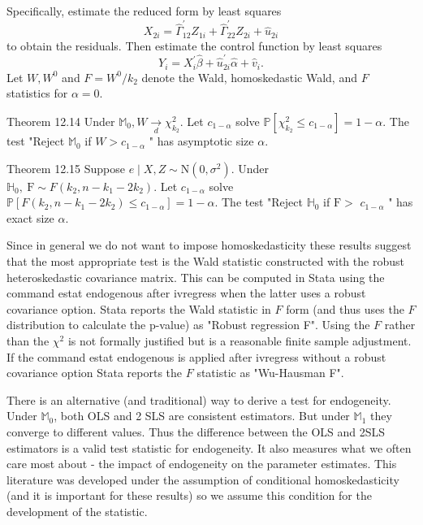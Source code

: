 \documentclass[10pt]{article}
\begin{document}
Specifically, estimate the reduced form by least squares
$$
X_{2 i}=\widehat{\Gamma}_{12}^{\prime} Z_{1 i}+\widehat{\Gamma}_{22}^{\prime} Z_{2 i}+\widehat{u}_{2 i}
$$
to obtain the residuals. Then estimate the control function by least squares
$$
Y_{i}=X_{i}^{\prime} \widehat{\beta}+\widehat{u}_{2 i}^{\prime} \widehat{\alpha}+\widehat{v}_{i} .
$$
Let $W, W^{0}$ and $F=W^{0} / k_{2}$ denote the Wald, homoskedastic Wald, and $F$ statistics for $\alpha=0$.

Theorem 12.14 Under $\mathbb{M}_{0}, W \underset{d}{\longrightarrow} \chi_{k_{2}}^{2}$. Let $c_{1-\alpha}$ solve $\mathbb{P}\left[\chi_{k_{2}}^{2} \leq c_{1-\alpha}\right]=1-\alpha$. The test "Reject $\mathbb{M}_{0}$ if $W>c_{1-\alpha}$ " has asymptotic size $\alpha$.

Theorem 12.15 Suppose $e \mid X, Z \sim \mathrm{N}\left(0, \sigma^{2}\right)$. Under $\mathbb{H}_{0}, \mathrm{~F} \sim F\left(k_{2}, n-k_{1}-2 k_{2}\right)$. Let $c_{1-\alpha}$ solve $\mathbb{P}\left[F\left(k_{2}, n-k_{1}-2 k_{2}\right) \leq c_{1-\alpha}\right]=1-\alpha$. The test "Reject $\mathbb{H}_{0}$ if $\mathrm{F}>$ $c_{1-\alpha}$ " has exact size $\alpha$.

Since in general we do not want to impose homoskedasticity these results suggest that the most appropriate test is the Wald statistic constructed with the robust heteroskedastic covariance matrix. This can be computed in Stata using the command estat endogenous after ivregress when the latter uses a robust covariance option. Stata reports the Wald statistic in $F$ form (and thus uses the $F$ distribution to calculate the p-value) as "Robust regression F". Using the $F$ rather than the $\chi^{2}$ is not formally justified but is a reasonable finite sample adjustment. If the command estat endogenous is applied after ivregress without a robust covariance option Stata reports the $F$ statistic as "Wu-Hausman F".

There is an alternative (and traditional) way to derive a test for endogeneity. Under $\mathbb{M}_{0}$, both OLS and 2 SLS are consistent estimators. But under $\mathbb{M}_{1}$ they converge to different values. Thus the difference between the OLS and 2SLS estimators is a valid test statistic for endogeneity. It also measures what we often care most about - the impact of endogeneity on the parameter estimates. This literature was developed under the assumption of conditional homoskedasticity (and it is important for these results) so we assume this condition for the development of the statistic.
\end{document}
